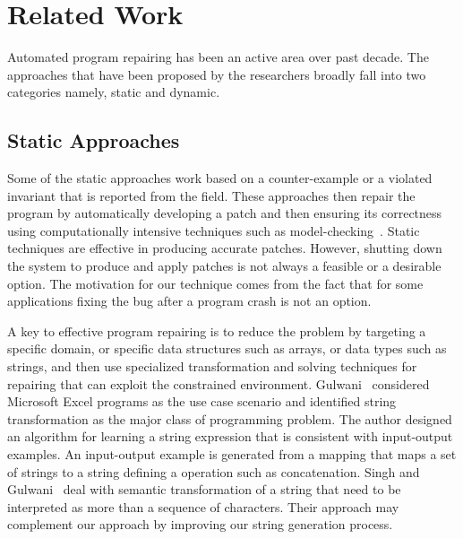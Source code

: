 \section{Related Work}
\label{sec:relatedWork}


Automated program repairing has been an active area over past decade. The
approaches that have been proposed by the researchers broadly fall into two
categories namely, static and dynamic.

\subsection{Static Approaches}

 Some of the static approaches work based on
a counter-example or a violated invariant that is reported from the field. These
approaches then repair the program by automatically developing a patch and then
ensuring its correctness using computationally intensive techniques such as
model-checking~\cite{biere2014, wei-issta-2010}. Static techniques are effective
in producing accurate patches. However, shutting down the system to produce and
apply patches is not always a feasible or a desirable option. The motivation for
our technique comes from the fact that for some applications fixing the bug
after a program crash is not an option.

 A key to effective program repairing is to
reduce the problem by targeting a specific domain, or specific data structures
such as arrays, or data types such as strings, and then use specialized
transformation and solving techniques for repairing that can exploit the
constrained environment. Gulwani~\cite{Gulwani:2011} considered Microsoft Excel
programs as the use case scenario and identified string transformation as the
major class of programming problem. The author designed an algorithm for
learning a string expression that is consistent with input-output examples. An
input-output example is generated from a mapping that maps a set of strings to
a string defining a operation such as concatenation. Singh and
Gulwani~\cite{Singh:2012} deal with semantic transformation of a string that
need to be interpreted as more than a sequence of characters. Their approach may
complement our approach by improving our string generation process.

